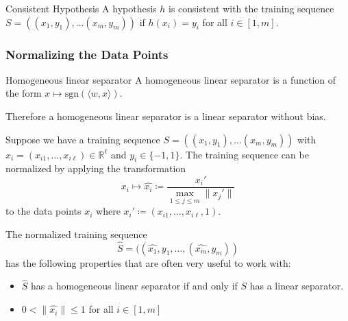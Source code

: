 \documentclass[english]{panikzettel}
\begin{document}
\begin{defi}{Consistent Hypothesis}
A hypothesis $h$ is consistent with the training sequence $S=((x_1,y_1),\ldots (x_m,y_m))$ if $h(x_i)=y_i$ for all $i\in [1,m]$.
\end{defi}

\subsubsection{Normalizing the Data Points}
\begin{defi}{Homogeneous linear separator}
A homogeneous linear separator is a function of the form $x\mapsto \text{sgn}(\langle w,x\rangle)$.
\end{defi}
Therefore a homogeneous linear separator is a linear separator without bias.



Suppose we have a training sequence $S=((x_1,y_1),\ldots (x_m,y_m))$ with $x_i=(x_{i1},\ldots, x_{i\ell})\in \mathbb{R}^\ell$ and $y_i\in \{-1,1\}$. The training sequence can be normalized by applying the transformation
\[
x_i\mapsto\hat{x_i} \coloneqq \frac{x_i'}{\max_{1\leq j\leq m} \parallel x_j'\parallel}
\]
to the data points $x_i$ where $x_i'\coloneqq (x_{i1},\ldots,x_{i\ell},1)$.

The normalized training sequence
\[
\hat{S}=((\widehat{x_1},y_1,\ldots,(\hat{x_m},y_m))
\]
has the following properties that are often very useful to work with:
\begin{itemize}
\item $\widehat{S}$ has a homogeneous linear separator if and only if $S$ has a linear separator.
\item $0<\parallel\widehat{x_i}\parallel\leq 1$ for all $i\in [1,m]$
\end{itemize}
\end{document}

